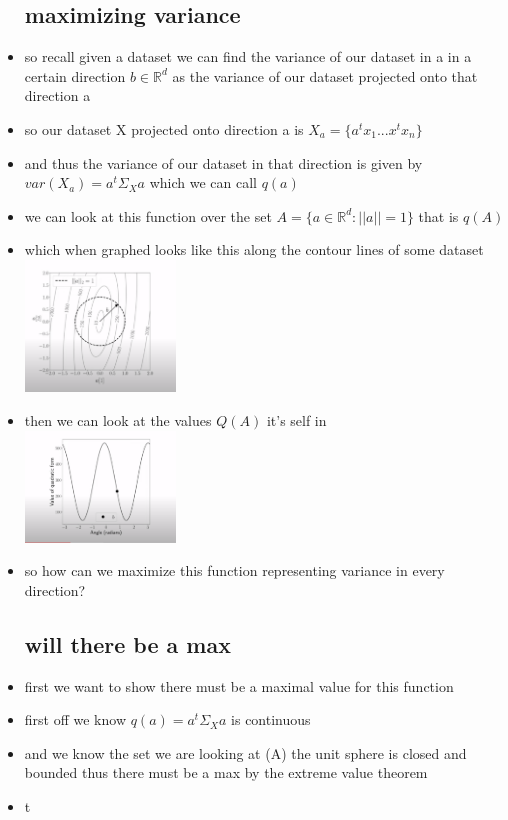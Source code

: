 \documentclass{article}
\begin{document}
\begin{itemize}
\subsection*{maximizing variance}
\item so recall given a dataset we can find the variance of our dataset in a 
 in a certain direction $b\in \mathbb{R}^{d}$ as the variance of our dataset projected
 onto that direction a
\item so our dataset X projected onto direction a is $X_{a}=\{a^tx_1...x^tx_n\}$
\item and thus the variance of our dataset in that direction is given by $var(X_a)=a^t\Sigma_{X}a$ 
which we can call $q(a)$
\item we can look at this function over the set $A=\{a\in \mathbb{R}^{d}:||a||=1\}$ that is $q(A)$
\item which when graphed looks like this along the contour lines of some dataset  \\ \includegraphics*[width=4cm]{notes/week_8/Vedio_3/immages/v3_1.png}
\item then we can look at the values $Q(A)$ it's self in  \\ \includegraphics*[width=4cm]{notes/week_8/Vedio_3/immages/v3_2.png}
\item so how can we maximize this function representing variance in every direction?
\subsection*{will there be a max}
\item first we want to show there must be a maximal value for this function
\item first off we know $q(a)=a^t\Sigma_{X}a$ is continuous 
\item  and we know the set we are looking at (A) the unit sphere is closed and bounded thus there must be a max by the extreme value theorem
\item t

\end{itemize}
\end{document}
